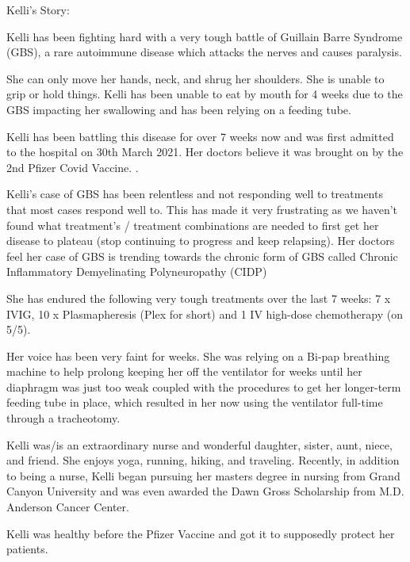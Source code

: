 Kelli’s Story:

Kelli has been fighting hard with a very tough battle of Guillain Barre Syndrome
(GBS), a rare autoimmune disease which attacks the nerves and causes paralysis.

She can only move her hands, neck, and shrug her shoulders. She is unable to
grip or hold things. Kelli has been unable to eat by mouth for 4 weeks due to
the GBS impacting her swallowing and has been relying on a feeding tube.

Kelli has been battling this disease for over 7 weeks now and was first admitted
to the hospital on 30th March 2021. Her doctors believe it was brought on by the
2nd Pfizer Covid Vaccine. .

Kelli’s case of GBS has been relentless and not responding well to treatments
that most cases respond well to. This has made it very frustrating as we haven’t
found what treatment’s / treatment combinations are needed to first get her
disease to plateau (stop continuing to progress and keep relapsing). Her doctors
feel her case of GBS is trending towards the chronic form of GBS called Chronic
Inflammatory Demyelinating Polyneuropathy (CIDP)

She has endured the following very tough treatments over the last 7 weeks: 7 x
IVIG, 10 x Plasmapheresis (Plex for short) and 1 IV high-dose chemotherapy (on
5/5).

Her voice has been very faint for weeks. She was relying on a Bi-pap breathing
machine to help prolong keeping her off the ventilator for weeks until her
diaphragm was just too weak coupled with the procedures to get her longer-term
feeding tube in place, which resulted in her now using the ventilator full-time
through a tracheotomy.

Kelli was/is an extraordinary nurse and wonderful daughter, sister, aunt, niece,
and friend. She enjoys yoga, running, hiking, and traveling. Recently, in
addition to being a nurse, Kelli began pursuing her masters degree in nursing
from Grand Canyon University and was even awarded the Dawn Gross Scholarship
from M.D. Anderson Cancer Center.

Kelli was healthy before the Pfizer Vaccine and got it to supposedly protect her
patients.

